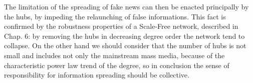 \documentclass[11pt, twoside]{report}
\begin{document}
    The limitation of the spreading of fake news can then be enacted principally by the hubs, by impeding the relaunching of false informations.
    This fact is confirmed by the robustness properties of a Scale-Free network, described in Chap. 6: by removing the hubs in decreasing degree order the network tend to collapse.
    On the other hand we should consider that the number of hubs is not small and includes not only the mainstream mass media, because of the characteristic power law trend of the degree, so in conclusion the sense of responsibility for information spreading should be collective.
        


\printbibliography[title={References}]
\end{document}
